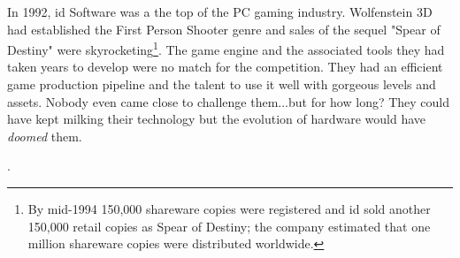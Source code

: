 In 1992, id Software was a the top of the PC gaming industry. Wolfenstein 3D had established the First
Person Shooter genre and sales of the sequel "Spear of Destiny" were skyrocketing\footnote{By mid-1994 150,000 shareware copies were registered and id sold another 150,000 retail copies as Spear of Destiny; the company estimated that one million shareware copies were distributed worldwide.}. The game engine and the associated 
tools they had taken years to develop were no match for the competition. They had an efficient game production pipeline and the talent to use it well with gorgeous levels and assets. Nobody even came close to challenge them...but for how long? They could have kept milking their technology but the evolution of hardware would have \textit{doomed} them.\\
\par

\par
{}. \\
\par


